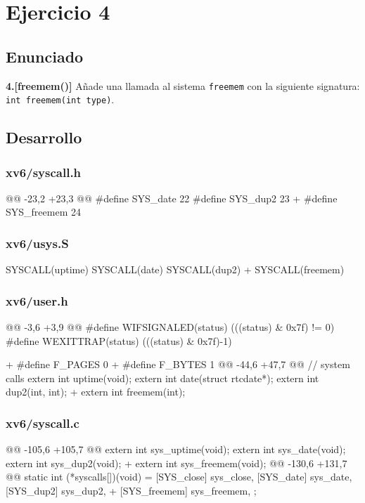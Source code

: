 \section{Ejercicio 4}

\subsection{Enunciado}
\begin{ejer}
    \textbf{4.[freemem()]} Añade una llamada al sistema \texttt{freemem} con la siguiente 
    signatura: \texttt{int freemem(int type)}.
\end{ejer}

\subsection{Desarrollo}

\subsubsection{xv6/syscall.h}
\begin{listing}
@@ -23,2 +23,3 @@
    #define SYS_date   22
    #define SYS_dup2   23
+   #define SYS_freemem 24
\end{listing}

\subsubsection{xv6/usys.S}
\begin{listing}
    SYSCALL(uptime)
    SYSCALL(date)
    SYSCALL(dup2)
+   SYSCALL(freemem)
\end{listing}

\subsubsection{xv6/user.h}
\begin{listing}
@@ -3,6 +3,9 @@
    #define WIFSIGNALED(status) (((status) & 0x7f) != 0)
    #define WEXITTRAP(status)   (((status) & 0x7f)-1)

+   #define F_PAGES 0
+   #define F_BYTES 1
@@ -44,6 +47,7 @@ 
// system calls
    extern int uptime(void);
    extern int date(struct rtcdate*);
    extern int dup2(int, int);
+   extern int freemem(int);
\end{listing}

\subsubsection{xv6/syscall.c}
\begin{listing}
@@ -105,6 +105,7 @@
    extern int sys_uptime(void);
    extern int sys_date(void);
    extern int sys_dup2(void);
+   extern int sys_freemem(void);
@@ -130,6 +131,7 @@ static int (*syscalls[])(void) = {
    [SYS_close]   sys_close,
    [SYS_date]    sys_date,
    [SYS_dup2]    sys_dup2,
+   [SYS_freemem] sys_freemem,
    };
\end{listing}


